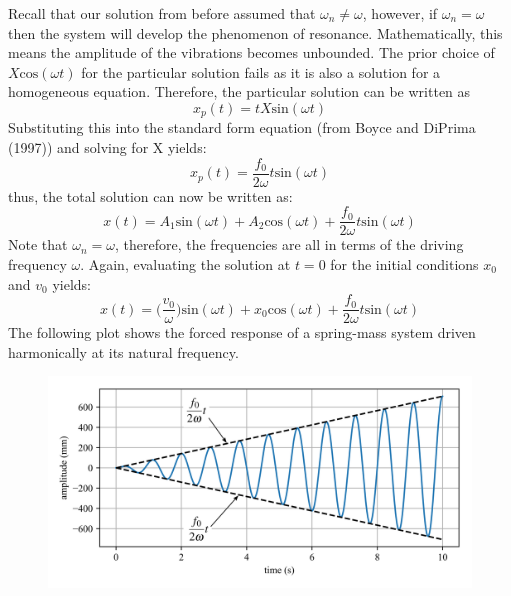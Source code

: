 \documentclass[12pt,letter]{article}
\numberwithin{ex}{section} %
\begin{document}
			Recall that our solution from before assumed that $\omega_n \neq \omega$, however, if $\omega_n = \omega$ then the system will develop the phenomenon of resonance. Mathematically, this means the amplitude of the vibrations becomes unbounded. The prior choice of $X\text{cos}(\omega t)$ for the particular solution fails as it is also a solution for a homogeneous equation. Therefore, the particular solution can be written as 
			\begin{equation}
				x_p(t) = t X\text{sin}(\omega t)
			\end{equation}				
			Substituting this into the standard form equation (from Boyce and DiPrima (1997)) and solving for X yields:
			\begin{equation}
				x_p(t) = \frac{f_0}{2 \omega} t \text{sin}(\omega t)
			\end{equation}	
			thus, the total solution can now be written as:
			\begin{equation}
				x(t) = A_1\text{sin}(\omega t) + A_2\text{cos}(\omega t) + \frac{f_0}{2 \omega} t \text{sin}(\omega t)
			\end{equation}			
			Note that $\omega_n=\omega$, therefore, the frequencies are all in terms of the driving frequency $\omega$. Again, evaluating the solution at $t=0$ for the initial conditions $x_0$ and $v_0$ yields:
			\begin{equation}
				x(t) = \Big(\frac{v_0}{\omega}\Big)\text{sin}(\omega t) + x_0\text{cos}(\omega t) + \frac{f_0}{2 \omega} t \text{sin}(\omega t)
			\end{equation}			
			The following plot shows the forced response of a spring-mass system driven harmonically at its natural frequency.
			\begin{figure}[H]
				\centering
				\includegraphics[]{../Figures/resonance.png}
			\end{figure}				
\end{document}
